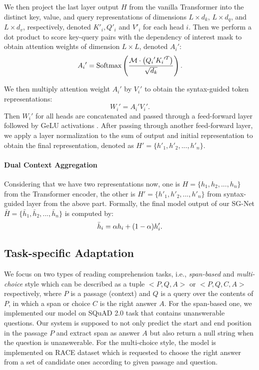 \documentclass[letterpaper]{article} \usepackage{color}
\begin{document}
We then project the last layer output $H$ from the vanilla Transformer into the distinct key, value, and query representations of dimensions $L\times d_k$, $L\times d_q$, and $L\times d_v$, respectively, denoted $K'_i, Q'_i$ and $V'_i$ for each head $i$. Then we perform a dot product to score key-query pairs with the dependency of interest mask to obtain attention weights of dimension $L\times L$, denoted $A_i'$:
\begin{equation}
{A_i}' = \textup{Softmax} \left( {\frac{{\mathcal{M}\cdot \left( {{Q_i}'{K_i}'^T} \right)}}{{\sqrt {{d_k}} }}} \right).
\end{equation}

We then multiply attention weight $A_i'$ by $V_i'$ to obtain the syntax-guided token representations:
\begin{equation}
W_i' = A_i'V_i'.	
\end{equation}
Then $W_i'$ for all heads are concatenated and passed through a feed-forward layer followed by GeLU activations \cite{hendrycks2016bridging}. After passing through another feed-forward layer, we apply a layer normalization to the sum of output and initial representation to obtain the final representation, denoted as $H'=\{h'_1,h'_2,...,h'_n\}$.




\paragraph{Dual Context Aggregation}
 Considering that we have two representations now, one is $H =\{h_1,h_2,...,h_n\}$  from the Transformer encoder, the other is $H'=\{h'_1,h'_2,...,h'_n\}$ from syntax-guided layer from the above part. Formally, the final model output of our SG-Net $\bar H=\{\bar h_1,\bar h_2,...,\bar h_n\}$ is computed by:
\begin{equation}
\bar h_i = \alpha h_i + (1-\alpha)h'_i. \\
\end{equation}

\subsection{Task-specific Adaptation} \label{mrc_models}
We focus on two types of reading comprehension tasks, i.e., \emph{span-based} and \emph{multi-choice} style which can be described as a tuple $<P, Q, A>$ or $<P, Q, C, A>$ respectively, where $P$ is a passage (context) and $Q$ is a query over the contents of $P$, in which a span or choice $C$ is the right answer $A$. For the span-based one, we implemented our model on SQuAD 2.0 task that contains unanswerable questions. Our system is supposed to not only predict the start and end position in the passage $P$ and extract span as answer $A$ but also return a null string when the question is unanswerable. For the multi-choice style, the model is implemented on RACE dataset which is requested to choose the right answer from a set of candidate ones according to given passage and question.
\end{document}
